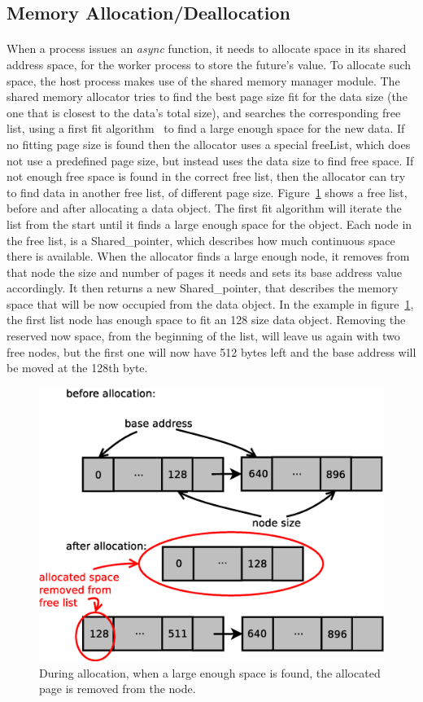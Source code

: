 \subsection{Memory Allocation/Deallocation}
\paragraph{}
When a process issues an \emph{async} function, it needs to allocate space in its shared address space, for the worker process to store the future's value.  To allocate such space, the host process makes use of the shared memory manager module. 
The shared memory allocator tries to find the best page size
fit for the data size (the one that is closest to the data's total size), and searches the corresponding free list, 
using a first fit algorithm~\cite[p.~185-187]{Tanenbaum:2007:MOS:1410217} to find a large 
enough space for the new data. If no fitting page size is found then the allocator uses a special freeList, 
which does not use a predefined page size, but instead uses the data size to find free space.  If not enough free
space is found in the correct free list, then the allocator can try to find data in another free list, of different
page size.  Figure~\ref{fig:alloc} shows a free list, before and after allocating a data object.
The first fit algorithm 
will iterate the list from the start until it finds a large enough space for the object.  Each node in the free list,
is a Shared\_pointer, which describes how much continuous space there is available.  When the allocator finds a large
enough node, it removes from that node the size and number of pages it needs and sets its base address value 
accordingly.
It then returns a new Shared\_pointer, that describes the memory space that will be now occupied from the data object.
In the example in figure~\ref{fig:alloc}, the first list node has enough space to fit an 128 size data object.  
Removing the reserved now space, from the beginning of the list, will leave us again with two free nodes, but the
first one will now have 512 bytes left and the base address will be moved at the 128th byte.

\begin{figure}[!ht]
\includegraphics[width=0.6\columnwidth]{figures/alloc}
\caption{During allocation, when a large enough space is found, the allocated page is removed from the node.}
\label{fig:alloc}
\end{figure}

